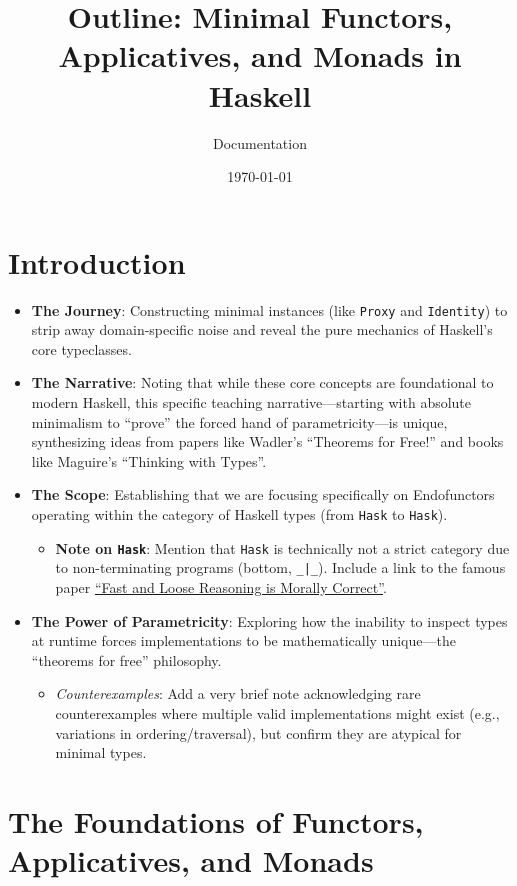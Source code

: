 \documentclass[12pt,a4paper]{article}
\title{Outline: Minimal Functors, Applicatives, and Monads in Haskell}
\author{Documentation}
\date{\today}
\begin{document}
\maketitle

\section{Introduction}
\begin{itemize}
    \item \textbf{The Journey}: Constructing minimal instances (like \texttt{Proxy} and \texttt{Identity}) to strip away domain-specific noise and reveal the pure mechanics of Haskell's core typeclasses.
    \item \textbf{The Narrative}: Noting that while these core concepts are foundational to modern Haskell, this specific teaching narrative---starting with absolute minimalism to ``prove'' the forced hand of parametricity---is unique, synthesizing ideas from papers like Wadler's ``Theorems for Free!'' and books like Maguire's ``Thinking with Types''.
    \item \textbf{The Scope}: Establishing that we are focusing specifically on Endofunctors operating within the category of Haskell types (from \texttt{Hask} to \texttt{Hask}).
    \begin{itemize}
        \item \textbf{Note on \texttt{Hask}}: Mention that \texttt{Hask} is technically not a strict category due to non-terminating programs (bottom, \texttt{\_|\_}). Include a link to the famous paper \href{https://www.cse.chalmers.se/~nad/publications/danielsson-et-al-popl2006.pdf}{``Fast and Loose Reasoning is Morally Correct''}.
    \end{itemize}
    \item \textbf{The Power of Parametricity}: Exploring how the inability to inspect types at runtime forces implementations to be mathematically unique—the ``theorems for free'' philosophy.
    \begin{itemize}
        \item \textit{Counterexamples}: Add a very brief note acknowledging rare counterexamples where multiple valid implementations might exist (e.g., variations in ordering/traversal), but confirm they are atypical for minimal types.
    \end{itemize}
\end{itemize}

\section{The Foundations of Functors, Applicatives, and Monads}
\end{document}
